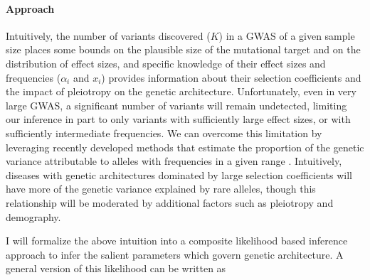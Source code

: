 \documentclass[11pt]{article}
\begin{document}
\paragraph{Approach}
 Intuitively, the number of variants discovered ($K$) in a GWAS of a given sample size places some bounds on the plausible size of the mutational target and on the distribution of effect sizes, and specific knowledge of their effect sizes and frequencies ($\alpha_i$ and $x_i$) provides information about their selection coefficients and the impact of pleiotropy on the genetic architecture. Unfortunately, even in very large GWAS, a significant number of variants will remain undetected, limiting our inference in part to only variants with sufficiently large effect sizes, or with sufficiently intermediate frequencies. We can overcome this limitation by leveraging recently developed methods that estimate the proportion of the genetic variance attributable to alleles with frequencies in a given range \cite{Visscher,others}. Intuitively, diseases with genetic architectures dominated by large selection coefficients will have more of the genetic variance explained by rare alleles, though this relationship will be moderated by additional factors such as pleiotropy and demography. 

\setlength{\abovedisplayskip}{15pt}
\setlength{\belowdisplayskip}{5pt}
\setlength{\jot}{-17pt}
I will formalize the above intuition into a composite likelihood based inference approach to infer the salient parameters which govern genetic architecture. A general version of this likelihood can be written as
\end{document}
